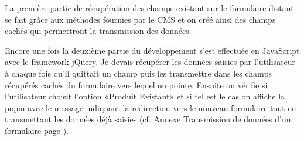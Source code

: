 \documentclass[a4paper,11pt,twoside]{report}
\begin{document}
      La première partie de récupération des champs existant sur le formulaire distant se fait grâce aux méthodes fournies par le CMS et on créé ainsi des champs cachés qui permettront la transmission des données. 
      \label{question_conditionnelle_1}
      
      Encore une fois la deuxième partie du développement s'est effectuée en JavaScript avec le framework jQuery. Je devais récupérer les données saisies par l'utilisateur à chaque fois qu'il quittait un champ puis les transmettre dans les champs récupérés cachés du formulaire vers lequel on pointe. Ensuite on vérifie si l'utilisateur choisit l'option «Produit Existant» et si tel est le cas on affiche la popin avec le message indiquant la redirection vers le nouveau formulaire tout en transmettant les données déjà saisies (cf. Annexe Transmission de données d'un formulaire page \pageref{transmission_de_donnees_d_un_formulaire}).
\end{document}
